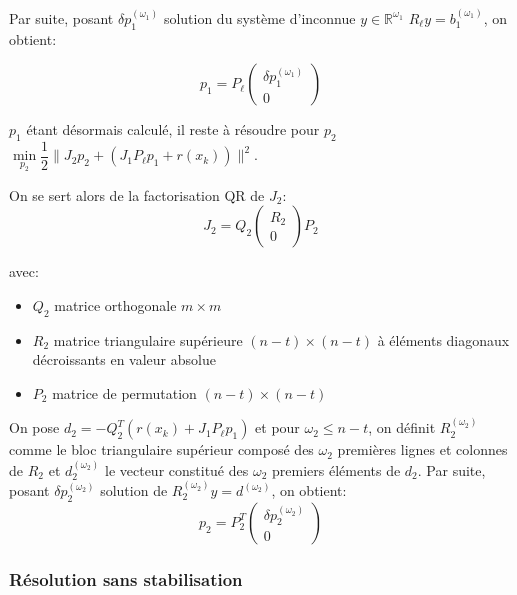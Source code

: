 \documentclass[a4paper,11pt]{article}
\newcommand{\real}{\mathbb{R}}
\numberwithin{equation}{section}
\begin{document}
 Par suite, posant $\delta p_1^{(\omega_{1})}$ solution du système d'inconnue $y \in \real^{\omega_{1}}$  $R_{\ell}y=b_{1}^{(\omega_{1})}$, on obtient:

\begin{equation}
p_1 = P_{\ell}\begin{pmatrix} \delta p_1^{(\omega_{1})} \\ 0 \end{pmatrix}
\end{equation}

$p_1$ étant désormais calculé, il reste à résoudre pour $p_2$ $\underset{p_2}{\min} \dfrac{1}{2}\|J_2p_2 + (J_1P_{\ell}p_1 + r(x_{k}))\|^2$. 


On se sert alors de la factorisation QR de $J_{2}$:
\begin{equation} \label{qrJ2}
J_{2} = Q_2\begin{pmatrix} R_{2} \\ 0\end{pmatrix}P_2
\end{equation}

avec:
\begin{itemize}
\item
$Q_2$ matrice orthogonale $m \times m$
\item
$R_{2}$ matrice triangulaire supérieure $(n-t) \times (n-t)$ à éléments diagonaux décroissants en valeur absolue 
\item
$P_2$ matrice de permutation $(n-t) \times (n-t)$
\end{itemize}

On pose $d_{2} = -Q_2^T(r(x_{k}) + J_1P_{\ell}p_1)$ et pour $\omega_{2} \leq n-t$, on définit $R_{2}^{(\omega_{2} )}$ comme le bloc triangulaire supérieur composé des $\omega_{2}$ premières lignes et colonnes de $R_{2}$ et $d_{2}^{(\omega_{2})} $ le vecteur constitué des $\omega_{2}$ premiers éléments de $d_{2}$.
Par suite, posant $\delta p_2^{(\omega_{2})}$ solution de $R_{2}^{(\omega_{2})}y =d^{(\omega_{2})}$, on obtient:
\begin{equation}
p_2 = P_2^T\begin{pmatrix} \delta p_2^{(\omega_{2})} \\ 0 \end{pmatrix}
\end{equation}

\subsubsection{Résolution sans stabilisation} \label{resolutionsstab}
\end{document}

